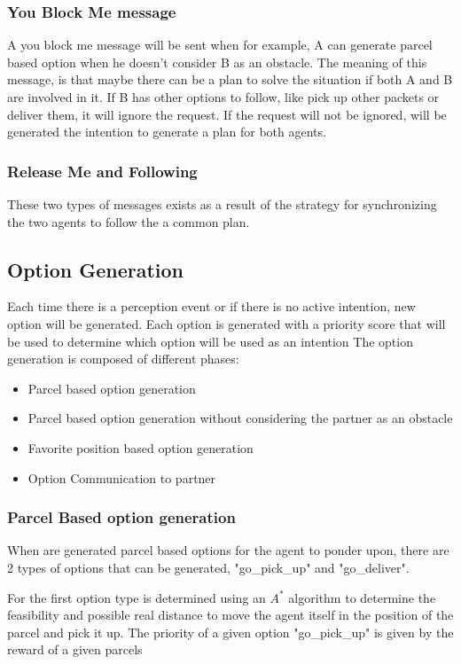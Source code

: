 \documentclass[conference]{IEEEtran}
\begin{document}
\subsubsection{You Block Me message}
A you block me message will be sent when for example, A can generate parcel based option when he doesn't consider B as an obstacle. The meaning of this message, is that maybe there can be a plan to solve the situation if both A and B are involved in it.
If B has other options to follow, like pick up other packets or deliver them, it will ignore the request. If the request will not be ignored, will be generated the intention to generate a plan for both agents.

\subsubsection{Release Me and Following}
These two types of messages exists as a result of the strategy for synchronizing the two agents to follow the a common plan.
\subsection{Option Generation}
Each time there is a perception event or if there is no active intention, new option will be generated.
Each option is generated with a priority score that will be used to determine which option will be used as an intention
The option generation is composed of different phases:
\begin{itemize}
    \item Parcel based option generation
    \item Parcel based option generation without considering the partner as an obstacle
    \item Favorite position based option generation
    \item Option Communication to partner
\end{itemize}

\subsubsection{Parcel Based option generation}
When are generated parcel based options for the agent to ponder upon, there are 2 types of options that can be generated, "go\_pick\_up" and "go\_deliver".

For the first option type is determined using an $A^{*}$ algorithm to determine the feasibility and possible real distance to move the agent itself in the position of the parcel and pick it up.
The priority of a given option "go\_pick\_up" is given by the reward of a given parcels
\end{document}
